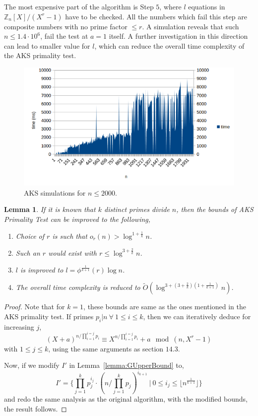 \documentclass[11pt]{article}
\newtheorem{lemma}[theorem]{Lemma}
\begin{document}
The most expensive part of the algorithm is Step $5$, where $l$ equations in $\mathbb{Z}_n[X]/(X^r-1)$ have to be checked. All the numbers which fail this step are composite numbers with no prime factor $\leq r$. A simulation reveals that such $n \leq 1.4 \cdot 10^6$, fail the test at $a = 1$ itself. A further investigation in this direction can lead to smaller value for $l$, which can reduce the overall time complexity of the AKS primality test.

\begin{figure}
  \includegraphics[width=\linewidth]{pictures/n-time-2000.png}
  \caption{AKS simulations for $n \leq 2000$.}
  \label{fig:aks_2000}
\end{figure}

\begin{lemma}
\label{lemma:AKSGenerelisation1}
If it is known that $k$ distinct primes divide $n$, then the bounds of AKS Primality Test can be improved to the following,
\begin{enumerate}[1.]%
\item Choice of $r$ is such that $o_r(n) > \log^{1 + \frac 1 {k}} n$.
\item Such an $r$ would exist with $r \leq \log^{3 + \frac 2 {k}} n$.
\item $l$ is improved to $l = \phi^\frac{1}{k+1}(r) \log n$.
\item The overall time complexity is reduced to $\tilde O(\log^{3 + (3 + \frac{2}{k})(1 + \frac{1}{k+1})} n)$.
\end{enumerate}
\end{lemma}
\begin{proof}
Note that for $k=1$, these bounds are same as the ones mentioned in the AKS primality test.
If primes $p_i | n\ \forall \ 1 \leq i \leq k$, then we can iteratively deduce for increasing $j$,
\[(X+a)^{n/\prod_{i=1}^{i=j} p_i} \equiv X^{n/\prod_{i=1}^{i=j} p_i} + a \mod (n, X^r - 1)\]
with $1 \leq j \leq k$, using the same arguments as section $14.3$. 

Now, if we modify $I'$ in Lemma~\ref{lemma:GUpperBound} to,
\[I' = \{ \prod_{j=1}^{k}p_j^{i_j} \cdot (n/\prod_{j=1}^{k}p_j)^{i_{k+1}} \ \vert \ 0 \leq i_j \leq \lfloor n^\frac{1}{k+1} \rfloor \}\]
and redo the same analysis as the original algorithm, with the modified bounds, the result follows.
\end{proof}
\end{document}
